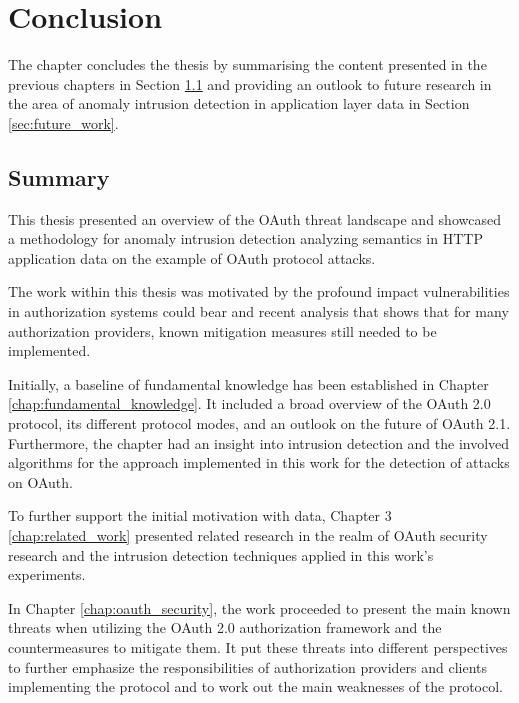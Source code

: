 \documentclass[
    fontsize=12pt,
    headings=small,
    parskip=half,           %
    bibliography=totoc,
    numbers=noenddot,       %
    open=any,               %
    ]{scrreprt}
\begin{document}
\chapter{Conclusion}
\label{chap:conclusion}

The chapter concludes the thesis by summarising the content presented in the previous chapters in Section \ref{sec:summary}  and providing an outlook to future research in the area of anomaly intrusion detection in application layer data in Section \ref{sec:future_work}.

\section{Summary}
\label{sec:summary}
This thesis presented an overview of the OAuth threat landscape and showcased a methodology for anomaly intrusion detection analyzing semantics in HTTP application data on the example of OAuth protocol attacks.

The work within this thesis was motivated by the profound impact vulnerabilities in authorization systems could bear and recent analysis that shows that for many authorization providers, known mitigation measures still needed to be implemented.

Initially, a baseline of fundamental knowledge has been established in Chapter \ref{chap:fundamental_knowledge}. It included a broad overview of the  OAuth 2.0 protocol, its different protocol modes, and an outlook on the future of OAuth 2.1. Furthermore, the chapter had an insight into intrusion detection and the involved algorithms for the approach implemented in this work for the detection of attacks on OAuth. 

To further support the initial motivation with data, Chapter 3
\ref{chap:related_work} presented related research in the realm of OAuth security research and the intrusion detection techniques applied in this work's experiments.

In Chapter \ref{chap:oauth_security}, the work proceeded to present the main known threats when utilizing the OAuth 2.0 authorization framework and the countermeasures to mitigate them. It put these threats into different perspectives to further emphasize the responsibilities of authorization providers and clients implementing the protocol and to work out the main weaknesses of the protocol.
\end{document}
